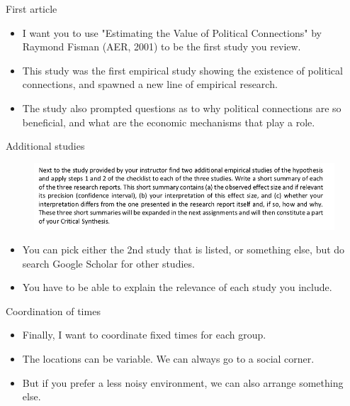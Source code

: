 \documentclass[aspectratio = 169, 12pt]{beamer}
\begin{document}
    \begin{frame}{First article}
        \begin{itemize}
            \item I want you to use "Estimating the Value of Political Connections" by Raymond Fisman (AER, 2001) to be the first study you review. 
            \item This study was the first empirical study showing the existence of political connections, and spawned a new line of empirical research.
            \item The study also prompted questions as to why political connections are so beneficial, and what are the economic mechanisms that play a role. 
        \end{itemize}
    \end{frame}
    
    \begin{frame}{Additional studies}
        \begin{figure}
            \centering
            \includegraphics[width = 1.0 \textwidth]{screen3.png}
            \label{fig:my_label}
        \end{figure}
        \begin{itemize}
            \item You can pick either the 2nd study that is listed, or something else, but do search Google Scholar for other studies.
            \item You have to be able to explain the relevance of each study you include.
        \end{itemize}
    \end{frame}
    
    \begin{frame}{Coordination of times}
        \begin{itemize}
            \item Finally, I want to coordinate fixed times for each group.
            \item The locations can be variable. We can always go to a social corner.
            \item But if you prefer a less noisy environment, we can also arrange something else. 
        \end{itemize}
    
    \end{frame}
    
\end{document}
